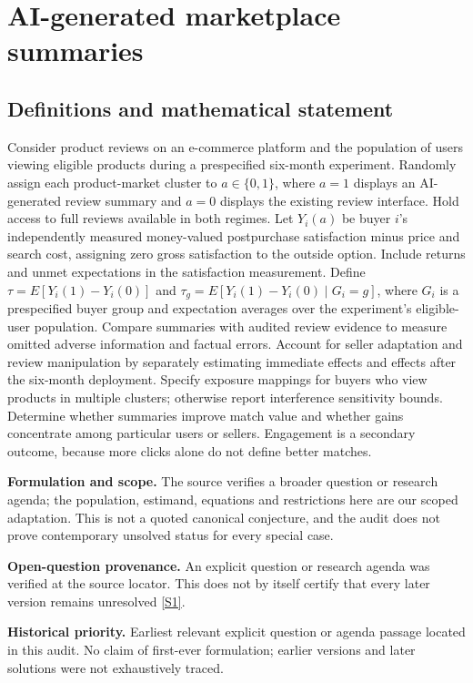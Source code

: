 \documentclass[11pt]{article}
\newcommand{\sref}[2]{\hyperlink{source:#1:#2}{[S#2]}}
\begin{document}
\section*{AI-generated marketplace summaries}\label{30007685}
\subsection{Definitions and mathematical statement}
Consider product reviews on an e-commerce platform and the population of users viewing eligible products during a prespecified six-month experiment. Randomly assign each product-market cluster to \(a\in\{0,1\}\), where \(a=1\) displays an AI-generated review summary and \(a=0\) displays the existing review interface. Hold access to full reviews available in both regimes. Let \(Y_i(a)\) be buyer \(i\)'s independently measured money-valued postpurchase satisfaction minus price and search cost, assigning zero gross satisfaction to the outside option. Include returns and unmet expectations in the satisfaction measurement. Define \(\tau=E[Y_i(1)-Y_i(0)]\) and \(\tau_g=E[Y_i(1)-Y_i(0)\mid G_i=g]\), where \(G_i\) is a prespecified buyer group and expectation averages over the experiment's eligible-user population. Compare summaries with audited review evidence to measure omitted adverse information and factual errors. Account for seller adaptation and review manipulation by separately estimating immediate effects and effects after the six-month deployment. Specify exposure mappings for buyers who view products in multiple clusters; otherwise report interference sensitivity bounds. Determine whether summaries improve match value and whether gains concentrate among particular users or sellers. Engagement is a secondary outcome, because more clicks alone do not define better matches.

\par\textbf{Formulation and scope.} The source verifies a broader question or research agenda; the population, estimand, equations and restrictions here are our scoped adaptation. This is not a quoted canonical conjecture, and the audit does not prove contemporary unsolved status for every special case.

\par\textbf{Open-question provenance.} An explicit question or research agenda was verified at the source locator. This does not by itself certify that every later version remains unresolved \sref{30007685}{1}.

\par\textbf{Historical priority.} Earliest relevant explicit question or agenda passage located in this audit. No claim of first-ever formulation; earlier versions and later solutions were not exhaustively traced.
\end{document}
